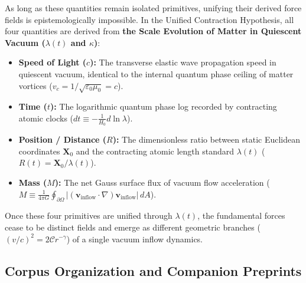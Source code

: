 As long as these quantities remain isolated primitives, unifying their derived force fields is epistemologically impossible. In the Unified Contraction Hypothesis, all four quantities are derived from \textbf{the Scale Evolution of Matter in Quiescent Vacuum ($\lambda(t)$ and $\kappa$)}:
\begin{itemize}
      \item \textbf{Speed of Light ($c$):} The transverse elastic wave propagation speed in quiescent vacuum, identical to the internal quantum phase ceiling of matter vortices ($v_c = 1/\sqrt{\varepsilon_0\mu_0} = c$).
      \item \textbf{Time ($t$):} The logarithmic quantum phase log recorded by contracting atomic clocks ($dt \equiv -\frac{1}{H_0} d\ln\lambda$).
      \item \textbf{Position / Distance ($R$):} The dimensionless ratio between static Euclidean coordinates $\mathbf{X}_0$ and the contracting atomic length standard $\lambda(t)$ ($R(t) = \mathbf{X}_0 / \lambda(t)$).
      \item \textbf{Mass ($M$):} The net Gauss surface flux of vacuum flow acceleration ($M \equiv \frac{1}{4\pi G} \oint_{\partial \Omega} |(\mathbf{v}_{\mathrm{inflow}} \cdot \nabla) \mathbf{v}_{\mathrm{inflow}}| \, dA$).
\end{itemize}

Once these four primitives are unified through $\lambda(t)$, the fundamental forces cease to be distinct fields and emerge as different geometric branches ($(v/c)^2 = 2\mathcal{C}r^{-\gamma}$) of a single vacuum inflow dynamics.

\subsection{Corpus Organization and Companion Preprints}
\label{sec:corpus_organization}

